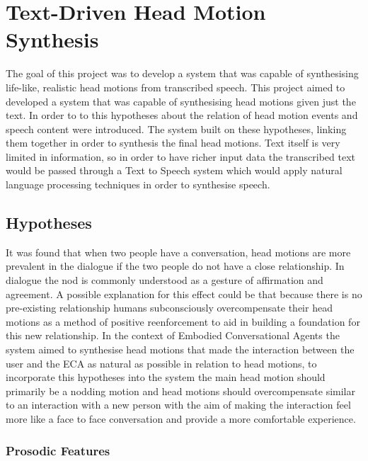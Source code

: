 \documentclass[bsc,frontabs,twoside,singlespacing,parskip]{infthesis}
\begin{document}

\chapter{Text-Driven Head Motion Synthesis}

The goal of this project was to develop a system that was capable of synthesising life-like, realistic head motions from transcribed speech. This project aimed to developed a system that was capable of synthesising head motions given just the text. In order to to this hypotheses about the relation of head motion events and speech content were introduced. The system built on these hypotheses, linking them together in order to synthesis the final head motions. Text itself is very limited in information, so in order to have richer input data the transcribed text would be passed through a Text to Speech system which would apply natural language processing techniques in order to synthesise speech. 

\section{Hypotheses}

It was  found that when two people have a conversation, head motions are more prevalent in the dialogue if the two people do not have a close relationship. \cite{first_paper} In dialogue the nod is commonly understood as a gesture of affirmation and agreement. A possible explanation for this effect could be that because there is no pre-existing relationship humans subconsciously overcompensate their head motions as a method of positive reenforcement to aid in building a foundation for this new relationship. In the context of Embodied Conversational Agents the system aimed to synthesise head motions that made the interaction between the user and the ECA as natural as possible in relation to head motions, to incorporate this hypotheses into the system the main head motion should primarily be a nodding motion and head motions should overcompensate similar to an interaction with a new person with the aim of making the interaction feel more like a face to face conversation and provide a  more comfortable experience.

\subsection{Prosodic Features}
\end{document}
